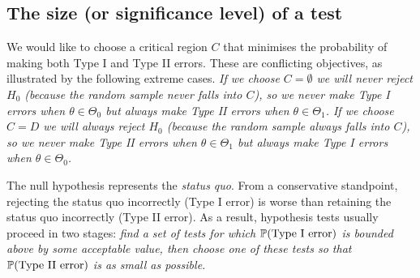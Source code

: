 
\subsection{The size (or significance level) of a test}

We would like to choose a critical region $C$ that minimises the probability of making both Type I and Type II errors. These are conflicting objectives, as illustrated by the following extreme cases.
\bit
\it If we choose $C=\emptyset$ we will never reject $H_0$ (because the random sample never falls into $C$), so we never make Type I errors when $\theta\in\Theta_0$ but always make Type II errors when $\theta\in\Theta_1$.
\it If we choose $C=D$ we will always reject $H_0$ (because the random sample always falls into $C$), so we never make Type II errors when $\theta\in\Theta_1$ but always make Type I errors when $\theta\in\Theta_0$.
\eit

\begin{remark}
The null hypothesis represents the \textit{status quo}. From a conservative standpoint, rejecting the status quo incorrectly (Type I error) is worse than retaining the status quo incorrectly (Type II error). As a result, hypothesis tests usually proceed in two stages:
\ben
\it find a set of tests for which $\mathbb{P}(\text{Type I error})$ is bounded above by some acceptable value, then
\it choose one of these tests so that $\mathbb{P}(\text{Type II error})$ is as small as possible.
\een
\end{remark}


